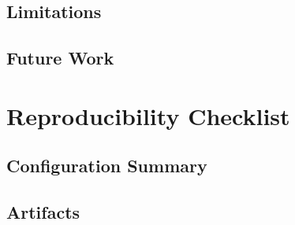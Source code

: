 \documentclass[12pt,a4paper]{report}
\begin{document}
\section{Limitations}

\section{Future Work}

\appendix
\chapter{Reproducibility Checklist}
\section{Configuration Summary}

\section{Artifacts}
\end{document}
